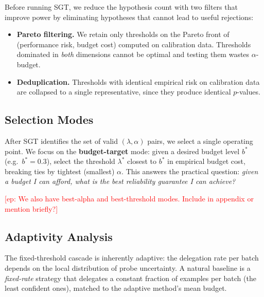 \documentclass{article}
\newcommand{\edoardo}[1]{\textcolor{red}{[ep: #1]}}
\begin{document}
Before running SGT, we reduce the hypothesis count with two filters that improve power by eliminating hypotheses that cannot lead to useful rejections:

\begin{itemize}
    \item \textbf{Pareto filtering.}
    We retain only thresholds on the Pareto front of (performance risk, budget cost) computed on calibration data. Thresholds dominated in \emph{both} dimensions cannot be optimal and testing them wastes $\alpha$-budget.
    \item \textbf{Deduplication.}
    Thresholds with identical empirical risk on calibration data are collapsed to a single representative, since they produce identical $p$-values.
\end{itemize}


\subsection{Selection Modes}
\label{sec:selection}

After SGT identifies the set of valid $(\lambda, \alpha)$ pairs, we select a single operating point.
We focus on the \textbf{budget-target} mode: given a desired budget level $b^*$ (e.g.\ $b^* = 0.3$), select the threshold $\lambda^*$ closest to $b^*$ in empirical budget cost, breaking ties by tightest (smallest) $\alpha$.
This answers the practical question: \emph{given a budget I can afford, what is the best reliability guarantee I can achieve?}

\edoardo{We also have best-alpha and best-threshold modes. Include in appendix or mention briefly?}


\subsection{Adaptivity Analysis}
\label{sec:adaptivity}

The fixed-threshold cascade is inherently adaptive: the delegation rate per batch depends on the local distribution of probe uncertainty. A natural baseline is a \emph{fixed-rate} strategy that delegates a constant fraction of examples per batch (the least confident ones), matched to the adaptive method's mean budget.
\end{document}

